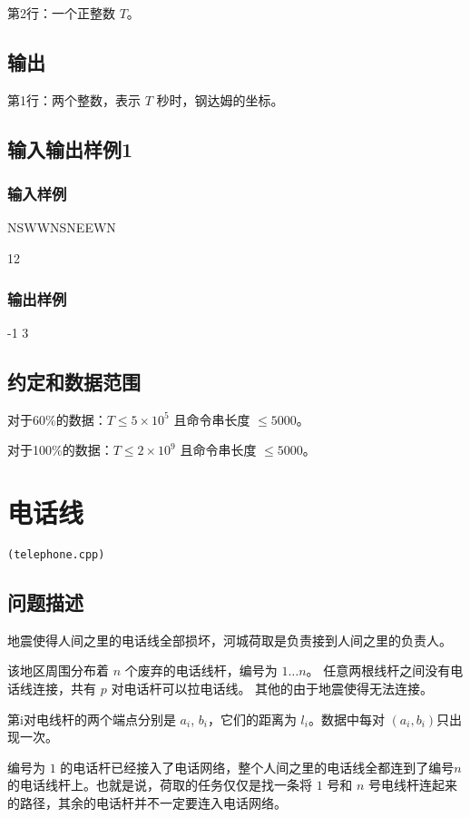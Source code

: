 \documentclass[UTF8]{ctexart}
\begin{document}
第2行：一个正整数 $T$。

\subsection{输出}

第1行：两个整数，表示 $T$ 秒时，钢达姆的坐标。

\subsection{输入输出样例1}
\subsubsection{输入样例}

NSWWNSNEEWN

12

\subsubsection{输出样例}

-1 3

\subsection{约定和数据范围}

对于60\%的数据：$T \le 5\times 10^5$ 且命令串长度 $\le 5000$。

对于100\%的数据：$T \le 2\times 10^9$ 且命令串长度 $\le 5000$。

\newpage
\section{电话线}
\begin{center}
\tt\large{(telephone.cpp)}
\end{center}
\subsection{问题描述}

地震使得人间之里的电话线全部损坏，河城荷取是负责接到人间之里的负责人。  

该地区周围分布着 $n$ 个废弃的电话线杆，编号为 $1\dots n$。  
任意两根线杆之间没有电话线连接，共有 $p$ 对电话杆可以拉电话线。  
其他的由于地震使得无法连接。

第i对电线杆的两个端点分别是 $a_{i}$, $b_{i}$，它们的距离为 $l_i$。数据中每对 $(a_i,b_i)$只出现一次。  

编号为 $1$ 的电话杆已经接入了电话网络，整个人间之里的电话线全都连到了编号$n$ 的电话线杆上。也就是说，荷取的任务仅仅是找一条将 $1$ 号和 $n$ 号电线杆连起来的路径，其余的电话杆并不一定要连入电话网络。
\end{document}
